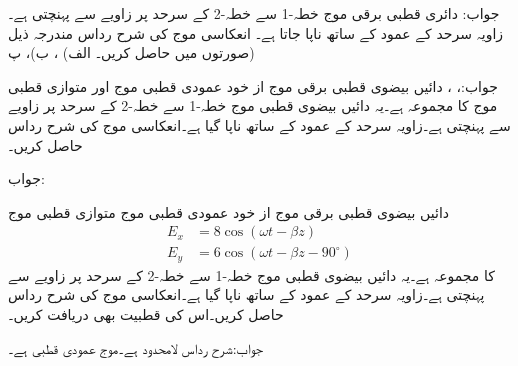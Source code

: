 جواب:
دائری قطبی برقی موج خطہ-1  سے خطہ-2   کے سرحد پر  زاویے سے  پہنچتی ہے۔زاویہ سرحد کے عمود کے ساتھ ناپا جاتا ہے۔ انعکاسی موج کی شرح رداس مندرجہ ذیل صورتوں میں حاصل کریں۔ الف) ،
 ب)، پ) 

جواب:، ، 
دائیں بیضوی قطبی برقی موج از خود عمودی قطبی موج   اور متوازی قطبی موج   کا مجموعہ ہے۔یہ دائیں بیضوی قطبی موج خطہ-1  سے خطہ-2   کے سرحد  پر  زاویے سے  پہنچتی ہے۔زاویہ سرحد کے عمود کے ساتھ ناپا گیا ہے۔انعکاسی موج کی شرح رداس حاصل کریں۔

جواب:

دائیں بیضوی قطبی برقی موج از خود عمودی قطبی موج     متوازی قطبی موج 
\begin{align*}
E_x&=8\cos(\omega t -\beta z)\\
E_y&=6\cos(\omega t -\beta z -90^{\circ})
\end{align*}
  کا مجموعہ ہے۔یہ دائیں بیضوی قطبی موج خطہ-1  سے خطہ-2   کے سرحد  پر  زاویے سے  پہنچتی ہے۔زاویہ سرحد کے عمود کے ساتھ ناپا گیا ہے۔انعکاسی موج کی شرح رداس حاصل کریں۔اس کی قطبیت بھی دریافت کریں۔

جواب:شرح رداس لامحدود ہے۔موج عمودی قطبی ہے۔
